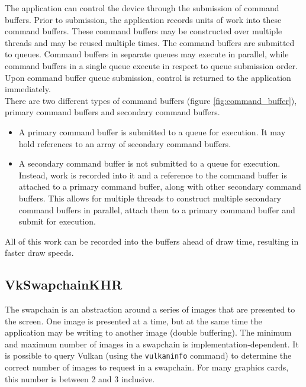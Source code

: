 \documentclass[12pt]{report}
\theoremstyle{definition}
\begin{document}
        The application can control the device through the submission of command
        buffers. Prior to submission, the application records units of work
        into these command buffers. These command buffers may be constructed
        over multiple threads and may be reused multiple times. The command
        buffers are submitted to queues. Command buffers in separate queues
        may execute in parallel, while command buffers in a single queue
        execute in respect to queue submission order. Upon command buffer
        queue submission, control is returned to the application immediately. \\

        There are two different types of command buffers (figure \ref{fig:command_buffer}),
        primary command buffers and secondary command buffers.

        \begin{itemize}
          \item A primary command buffer is submitted to a queue for execution.
          It may hold references to an array of secondary command buffers.
          \item A secondary command buffer is not submitted to a queue for
          execution. Instead, work is recorded into it and a reference to the
          command buffer is attached to a primary command buffer, along with
          other secondary command buffers. This allows for multiple threads to
          construct multiple secondary command buffers in parallel, attach
          them to a primary command buffer and submit for execution.
        \end{itemize}

        All of this work can be recorded into the buffers ahead of draw time,
        resulting in faster draw speeds.

      \subsection{VkSwapchainKHR}

        The swapchain is an abstraction around a series of images that are presented
        to the screen. One image is presented at a time, but at the same time 
        the application may be writing to another image (double buffering). The
        minimum and maximum number of images in a swapchain is implementation-dependent.
        It is possible to query Vulkan (using the \texttt{vulkaninfo} command)
        to determine the correct number of images to request in a swapchain. For
        many graphics cards, this number is between 2 and 3 inclusive. \\
\end{document}
